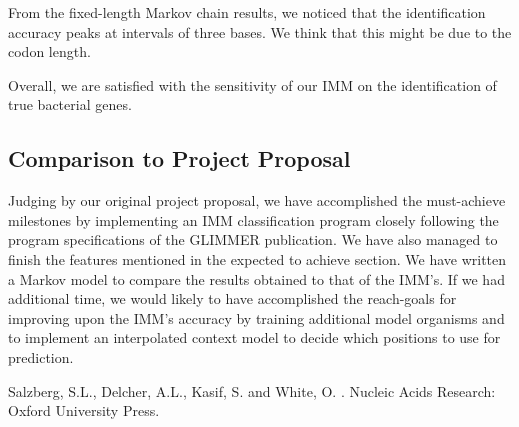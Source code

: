 \documentclass[11pt,letterpaper]{article}
\begin{document}
From the fixed-length Markov chain results, we noticed that the identification accuracy peaks at intervals of three bases. We think that this might be due to the codon length. 

Overall, we are satisfied with the sensitivity of our IMM on the identification of true bacterial genes.

\subsection{Comparison to Project Proposal}
Judging by our original project proposal, we have accomplished the must-achieve milestones by implementing an IMM classification program closely following the program specifications of the GLIMMER publication. We have also managed to finish the features mentioned in the expected to achieve section. We have written a Markov model to compare the results obtained to that of the IMM’s. If we had additional time, we would likely to have accomplished the reach-goals for improving upon the IMM’s accuracy by training additional model organisms and to implement an interpolated context model to decide which positions to use for prediction.


\begin{thebibliography}{}

Salzberg, S.L., Delcher, A.L., Kasif, S. and White, O.
.
\newblock Nucleic Acids Research: Oxford University Press.

\end{thebibliography}
\end{document}
